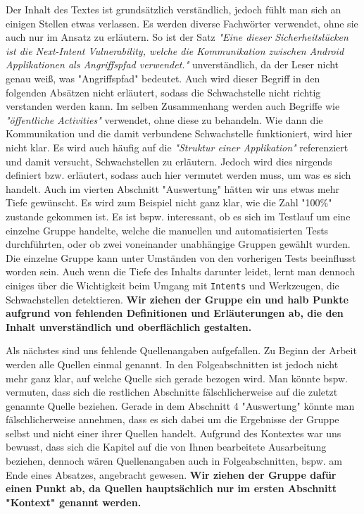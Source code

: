 \documentclass{article}
\begin{document}
  Der Inhalt des Textes ist grundsätzlich verständlich, jedoch fühlt man sich an
  einigen Stellen etwas verlassen. Es werden diverse Fachwörter verwendet, ohne
  sie auch nur im Ansatz zu erläutern. So ist der Satz \textit{"Eine dieser
  Sicherheitslücken ist die Next-Intent Vulnerability, welche die Kommunikation
  zwischen Android Applikationen als Angriffspfad verwendet."} unverständlich,
  da der Leser nicht genau weiß, was "Angriffspfad" bedeutet. Auch wird dieser
  Begriff in den folgenden Absätzen nicht erläutert, sodass die Schwachstelle
  nicht richtig verstanden werden kann. Im selben Zusammenhang werden auch
  Begriffe wie \textit{"öffentliche Activities"} verwendet, ohne diese zu
  behandeln. Wie dann die Kommunikation und die damit verbundene Schwachstelle
  funktioniert, wird hier nicht klar. Es wird auch häufig auf die
  \textit{"Struktur einer Applikation"} referenziert und damit versucht,
  Schwachstellen zu erläutern. Jedoch wird dies nirgends definiert bzw.
  erläutert, sodass auch hier vermutet werden muss, um was es sich handelt.
  Auch im vierten Abschnitt "Auswertung" hätten wir uns etwas mehr Tiefe
  gewünscht. Es wird zum Beispiel nicht ganz klar, wie die Zahl "100\%" zustande
  gekommen ist. Es ist bspw. interessant, ob es sich im Testlauf um eine einzelne
  Gruppe handelte, welche die manuellen und automatisierten Tests durchführten,
  oder ob zwei voneinander unabhängige Gruppen gewählt wurden. Die einzelne
  Gruppe kann unter Umständen von den vorherigen Tests beeinflusst worden sein.
  Auch wenn die Tiefe des Inhalts darunter leidet, lernt man dennoch einiges
  über die Wichtigkeit beim Umgang mit \texttt{Intents} und Werkzeugen, die
  Schwachstellen detektieren.  \textbf{Wir ziehen der Gruppe ein und halb Punkte
  aufgrund von fehlenden Definitionen und Erläuterungen ab, die den Inhalt
  unverständlich und oberflächlich gestalten.}

  Als nächstes sind uns fehlende Quellenangaben aufgefallen. Zu Beginn der
  Arbeit werden alle Quellen einmal genannt. In den Folgeabschnitten ist jedoch
  nicht mehr ganz klar, auf welche Quelle sich gerade bezogen wird. Man könnte
  bspw. vermuten, dass sich die restlichen Abschnitte fälschlicherweise auf die
  zuletzt genannte Quelle beziehen. Gerade in dem Abschnitt 4 "Auswertung"
  könnte man fälschlicherweise annehmen, dass es sich dabei um die Ergebnisse
  der Gruppe selbst und nicht einer ihrer Quellen handelt. Aufgrund des
  Kontextes war uns bewusst, dass sich die Kapitel auf die von Ihnen bearbeitete
  Ausarbeitung beziehen, dennoch wären Quellenangaben auch in Folgeabschnitten,
  bspw. am Ende eines Absatzes, angebracht gewesen. \textbf{Wir ziehen der
  Gruppe dafür einen Punkt ab, da Quellen hauptsächlich nur im ersten
  Abschnitt "Kontext" genannt werden.}
\end{document}
